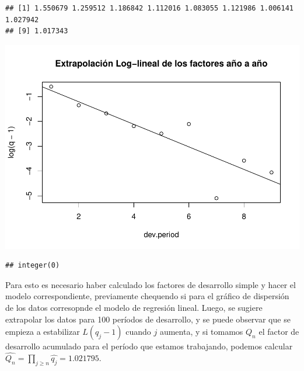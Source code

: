 \documentclass[
  12pt,
]{article}
\begin{document}
\begin{verbatim}
## [1] 1.550679 1.259512 1.186842 1.112016 1.083055 1.121986 1.006141 1.027942
## [9] 1.017343
\end{verbatim}

\includegraphics{informe_files/figure-latex/unnamed-chunk-7-1.pdf}

\begin{verbatim}
## integer(0)
\end{verbatim}

Para esto es necesario haber calculado los factores de desarrollo simple
y hacer el modelo correspondiente, previamente chequendo si para el
gráfico de dispersión de los datos corresopnde el modelo de regresión
lineal. Luego, se sugiere extrapolar los datos para 100 períodos de
desarrollo, y se puede observar que se empieza a estabilizar
\(L(q_j -1)\) cuando \(j\) aumenta, y si tomamos \(Q_n\) el factor de
desarrollo acumulado para el período que estamos trabajando, podemos
calcular \(\hat{Q_n} = \prod_{j\geq n} \hat{q_{j}} = 1.021795\).
\end{document}
